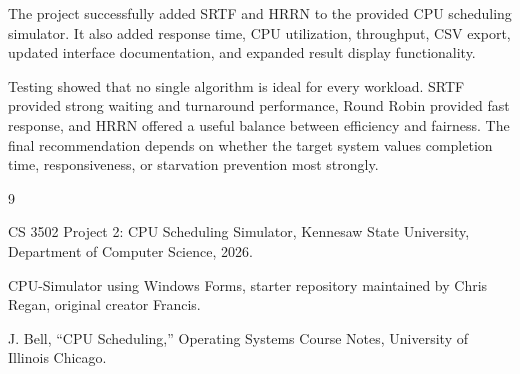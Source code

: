 \documentclass[12pt]{article}
\begin{document}
The project successfully added SRTF and HRRN to the provided CPU scheduling
simulator. It also added response time, CPU utilization, throughput, CSV export,
updated interface documentation, and expanded result display functionality.

Testing showed that no single algorithm is ideal for every workload. SRTF
provided strong waiting and turnaround performance, Round Robin provided fast
response, and HRRN offered a useful balance between efficiency and fairness.
The final recommendation depends on whether the target system values completion
time, responsiveness, or starvation prevention most strongly.

\begin{thebibliography}{9}

CS 3502 Project 2: CPU Scheduling Simulator, Kennesaw State University,
Department of Computer Science, 2026.

CPU-Simulator using Windows Forms, starter repository maintained by Chris
Regan, original creator Francis.

J. Bell, ``CPU Scheduling,'' Operating Systems Course Notes,
University of Illinois Chicago.

\end{thebibliography}
\end{document}
